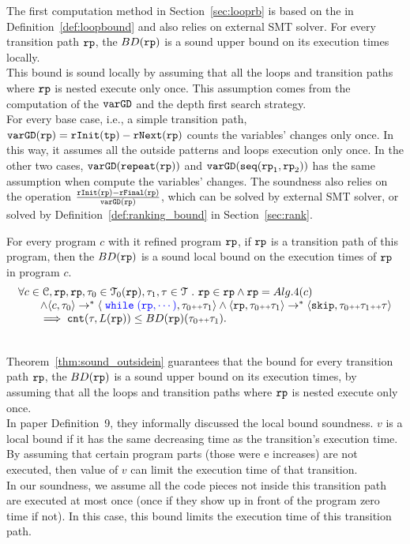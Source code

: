 The first computation method in Section~\ref{sec:looprb} is based on the in Definition~\ref{def:loopbound} and also relies on external SMT solver.
For every transition path $\mathtt{rp}$, the $BD(\mathtt{rp})$
is a sound upper bound on its execution times locally.
\\
This bound is sound locally by assuming
that all the loops and transition paths where $\mathtt{rp}$ is nested execute only once.
This assumption comes from the computation of the $\mathtt{varGD}$ and the depth first search strategy.
\\
For every base case, i.e., a simple transition path, 
$\mathtt{varGD}(\mathtt{rp}) =  \mathtt{rInit}(\mathtt{tp}) - \mathtt{rNext}(\mathtt{rp})$
counts the variables' changes only once. In this way, it assumes all the outside patterns and loops execution only once.
In the other two cases,  $\mathtt{varGD}(\mathtt{repeat}(\mathtt{rp}))$ and $\mathtt{varGD}(\mathtt{seq}(\mathtt{rp}_1, \mathtt{rp}_2))$
has the same assumption when compute the variables' changes.
The soundness also relies on the operation $\frac{\mathtt{rInit}(\mathtt{rp}) - \mathtt{rFinal}(\mathtt{rp})}{\mathtt{varGD}(\mathtt{rp})}$,
which can be solved by external SMT solver,
or solved by Definition~\ref{def:ranking_bound} in Section~\ref{sec:rank}.
%
\begin{thm}
\label{thm:sound_outsidein}
For every program $c$ with it refined program $\mathtt{rp}$,
if $\mathtt{rp}$ is a transition path of this program, then the $BD(\mathtt{rp})$
is a sound local bound on the execution times of $\mathtt{rp}$ in program $c$.
\[
    \begin{array}{l}
    \forall c \in \cdom, \rprog, \rprog, \trace_0 \in \tdom_0(\rprog), \trace_1, \trace \in \tdom \st 
    \rprog \in \rprog \land
    \rprog = Alg.4(c)
    \\ \qquad
    \land
    \config{c, \trace_0} \to^* \config{\highlight{\ewhile (\rprog, \cdots)}, \trace_0 \tracecat \trace_1} 
    \land 
    \config{\rprog, \trace_0 \tracecat \trace_1} \to^* \config{{\eskip, \trace_0 \tracecat \trace_1 \tracecat \trace}}
    \\ \qquad
    \implies {\counter(\trace, L(\rprog))} \leq BD(\rprog)(\trace_0 \tracecat \trace_1).
    \end{array}
\]
\end{thm}
\\
Theorem~\ref{thm:sound_outsidein} guarantees that
the bound for every transition path $\mathtt{rp}$, the $BD(\mathtt{rp})$
is a sound upper bound on its execution times, by assuming
that all the loops and transition paths where $\mathtt{rp}$ is nested execute only once.
\\
In paper \cite{sinn2017complexity} Definition~9, they informally discussed the local bound soundness.
$v$ is a local bound if it has the same decreasing time as the transition's execution time.
By assuming that certain program parts (those were e increases) are not executed,
then value of $v$ can limit the execution time of that transition.
\\
In our soundness, we assume all the code pieces not inside this transition path are executed at most once (once if they show up in front of the program
zero time if not).
In this case, this bound limits the execution time of this transition path.


